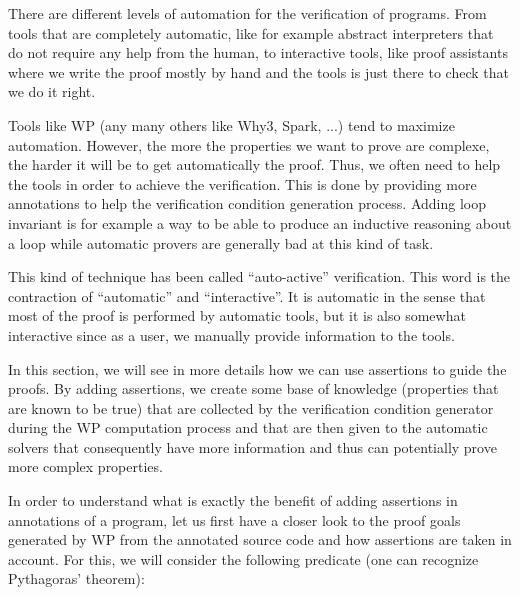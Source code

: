 There are different levels of automation for the verification of programs. From
tools that are completely automatic, like for example abstract interpreters that
do not require any help from the human, to interactive tools, like proof
assistants where we write the proof mostly by hand and the tools is just there
to check that we do it right.



Tools like WP (any many others like Why3, Spark, ...) tend to maximize
automation. However, the more the properties we want to prove are complexe, the
harder it will be to get automatically the proof. Thus, we often need to help
the tools in order to achieve the verification. This is done by providing more
annotations to help the verification condition generation process. Adding loop
invariant is for example a way to be able to produce an inductive reasoning
about a loop while automatic provers are generally bad at this kind of task.



This kind of technique has been called ``auto-active'' verification. This word
is the contraction of ``automatic'' and ``interactive''. It is automatic in the
sense that most of the proof is performed by automatic tools, but it is also
somewhat interactive since as a user, we manually provide information to the
tools.



In this section, we will see in more details how we can use assertions to guide
the proofs. By adding assertions, we create some base of knowledge (properties
that are known to be true) that are collected by the verification condition
generator during the WP computation process and that are then given to the
automatic solvers that consequently have more information and thus can
potentially prove more complex properties.






In order to understand what is exactly the benefit of adding assertions in
annotations of a program, let us first have a closer look to the proof goals
generated by WP from the annotated source code and how assertions are taken in
account. For this, we will consider the following predicate (one can recognize
Pythagoras' theorem):






